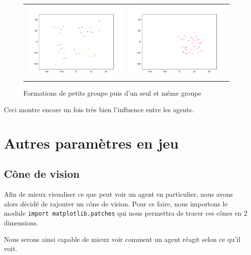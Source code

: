 \documentclass[french, a4paper, 12pt, openany]{report}
\begin{document}
   \begin{figure}[!h]
		\centering
		\begin{tabular}{cc}
			\includegraphics[width=8cm]{images/image_7.png} & \includegraphics[width=8cm]{images/image_9.png} \\
		\end{tabular}
		\caption{Formations de petits groupe puis d'un seul et même groupe}
		\label{mouvement_grp2}
	\end{figure} 
	
	Ceci montre encore un fois très bien l'influence entre les agents.

\section{Autres paramètres en jeu}
	\subsection{Cône de vision}
	
		Afin de mieux visualiser ce que peut voir un agent en particulier, nous avons alors décidé de rajouter un cône de vision. Pour ce faire, nous importons le module \verb|import matplotlib.patches| qui nous permettra de tracer ces cônes en 2 dimensions.
		
		Nous serons ainsi capable de mieux voir comment un agent réagit selon ce qu'il voit. \\
		
\end{document}
